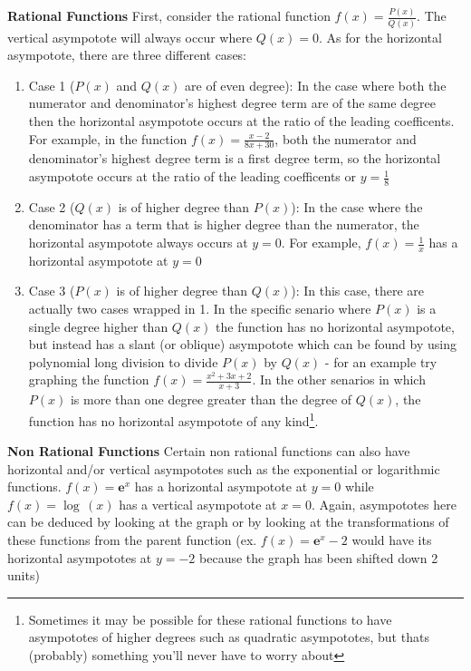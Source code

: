 \documentclass[addpoints]{exam}
\begin{document}
\begin{tcolorbox}[breakable, title=GENERAL FUNCTIONS, colframe=black, sharp corners, colback=white, colbacktitle=white, coltitle=black]
  \vspace{0.05in}
  \newline\large\textbf{Rational Functions}
  \newline\normalsize First, consider the rational function $f(x)=\frac{P(x)}{Q(x)}$. The vertical asympotote will always occur where $Q(x)=0$. As for the horizontal asympotote, there are three different cases:
  \begin{enumerate}
    \item Case 1 ($P(x)$ and $Q(x)$ are of even degree): In the case where both the numerator and denominator's highest degree term are of the same degree then the horizontal asympotote occurs at the ratio of the leading coefficents. For example, in the function $f(x)=\frac{x-2}{8x+30}$, both the numerator and denominator's highest degree term is a first degree term, so the horizontal asympotote occurs at the ratio of the leading coefficents or $y=\frac{1}{8}$
    \item Case 2 ($Q(x)$ is of higher degree than $P(x)$): In the case where the denominator has a term that is higher degree than the numerator, the horizontal asympotote always occurs at $y=0$. For example, $f(x)=\frac{1}{x}$ has a horizontal asympotote at $y=0$
    \item Case 3 ($P(x)$ is of higher degree than $Q(x)$): In this case, there are actually two cases wrapped in 1. In the specific senario where $P(x)$ is a single degree higher than $Q(x)$ the function has no horizontal asympotote, but instead has a slant (or oblique) asympotote which can be found by using polynomial long division to divide $P(x)$ by $Q(x)$ - for an example try graphing the function $f(x)=\frac{x^2+3x+2}{x+3}$. In the other senarios in which $P(x)$ is more than one degree greater than the degree of $Q(x)$, the function has no horizontal asympotote of any kind\footnote{Sometimes it may be possible for these rational functions to have asympototes of higher degrees such as quadratic asympototes, but thats (probably) something you'll never have to worry about}.
  \end{enumerate}
  \vspace{0.05in}
  \large\textbf{Non Rational Functions}
  \newline\normalsize Certain non rational functions can also have horizontal and/or vertical asympototes such as the exponential or logarithmic functions. $f(x)=\textbf{e}^x$ has a horizontal asympotote at $y=0$ while \\ $f(x)=\log\,(x)$ has a vertical asympotote at $x=0$. Again, asympototes here can be deduced by looking at the graph or by looking at the transformations of these functions from the parent function (ex. $f(x)=\textbf{e}^x-2$ would have its horizontal asympototes at $y=-2$ because the graph has been shifted down 2 units)

\end{tcolorbox}
\end{document}
